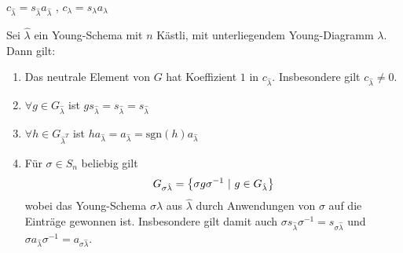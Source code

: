 \begin{definition}
    $c_{\hat{\lambda}} = s_{\hat{\lambda}} a_{\hat{\lambda}}$ ,
    $c_\lambda = s_\lambda a_\lambda$
\end{definition}

\begin{lemma}
    Sei $\hat{\lambda}$ ein Young-Schema mit $n$ Kästli, mit unterliegendem
    Young-Diagramm $\lambda$. Dann gilt:
    \begin{enumerate}[(1)]
        \item Das neutrale Element von $G$ hat Koeffizient $1$ in $c_{\hat{\lambda}}$.
            Insbesondere gilt $c_{\hat{\lambda}} \neq 0$.
        \item $\forall g \in G_{\hat{\lambda}}$ ist $g s_{\hat{\lambda}} = s_{\hat{\lambda}} = s_{\hat{\lambda}}$
        \item $\forall h \in G_{\hat{\lambda}^T}$ ist $h a_{\hat{\lambda}} = a_{\hat{\lambda}} = \text{sgn}(h)a_{\hat{\lambda}}$
        \item Für $\sigma \in S_n$ beliebig gilt
            \begin{align*}
                G_{\sigma \hat{\lambda}} = \left\{ \sigma g \sigma^{-1} \ | \ g \in G_{\hat{\lambda}} \right\}
            \end{align*}
            wobei das Young-Schema $\sigma \hat{\lambda}$ aus $\hat{\lambda}$
            durch Anwendungen von $\sigma$ auf die Einträge gewonnen ist.
            Insbesondere gilt damit auch $\sigma s_{\hat{\lambda}} \sigma^{-1} =
            s_{\sigma \hat{\lambda}}$ und $\sigma a_{\hat{\lambda}} \sigma^{-1}
            = a_{\sigma \hat{\lambda}}$.
    \end{enumerate}
\end{lemma}


